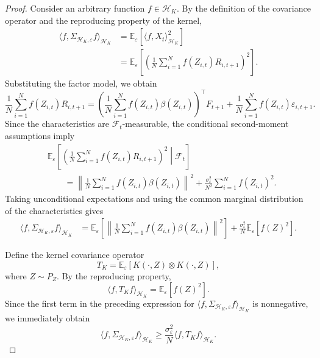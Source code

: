 \begin{proof}
Consider an arbitrary function $f\in\mathcal H_K$. By the definition of the covariance operator and the reproducing property of the kernel,
\[
\begin{aligned}
\langle f,\Sigma_{\mathcal H_K,\varepsilon}f\rangle_{\mathcal H_K}
&=\mathbb E_\varepsilon[\langle f,X_t\rangle_{\mathcal H_K}^2]\\
&=\mathbb E_\varepsilon\left[
\left(\frac1N\sum_{i=1}^N f(Z_{i,t})R_{i,t+1}\right)^2
\right].
\end{aligned}
\]
Substituting the factor model, we obtain
\[
\frac1N\sum_{i=1}^N f(Z_{i,t})R_{i,t+1}
=\left(\frac1N\sum_{i=1}^N f(Z_{i,t})\beta(Z_{i,t})\right)^\top F_{t+1}
+\frac1N\sum_{i=1}^N f(Z_{i,t})\varepsilon_{i,t+1}.
\]
Since the characteristics are $\mathcal F_t$-measurable, the conditional second-moment assumptions imply
\[
\begin{aligned}
&\mathbb E_\varepsilon\left[
\left(\frac1N\sum_{i=1}^N f(Z_{i,t})R_{i,t+1}\right)^2
\middle|\mathcal F_t\right]\\
&\qquad=
\left\|\frac1N\sum_{i=1}^N f(Z_{i,t})\beta(Z_{i,t})\right\|^2
+\frac{\sigma_\varepsilon^2}{N^2}\sum_{i=1}^N f(Z_{i,t})^2.
\end{aligned}
\]
Taking unconditional expectations and using the common marginal distribution of the characteristics gives
\[
\begin{aligned}
\langle f,\Sigma_{\mathcal H_K,\varepsilon}f\rangle_{\mathcal H_K}
&=\mathbb E_\varepsilon\left[
\left\|\frac1N\sum_{i=1}^N f(Z_{i,t})\beta(Z_{i,t})\right\|^2
\right]
+\frac{\sigma_\varepsilon^2}{N}\mathbb E_\varepsilon[f(Z)^2].
\end{aligned}
\]

Define the kernel covariance operator
\[
T_K=\mathbb E_\varepsilon[K(\cdot,Z)\otimes K(\cdot,Z)],
\]
where $Z\sim P_Z$. By the reproducing property,
\[
\langle f,T_Kf\rangle_{\mathcal H_K}
=\mathbb E_\varepsilon[f(Z)^2].
\]
Since the first term in the preceding expression for $\langle f,\Sigma_{\mathcal H_K,\varepsilon}f\rangle_{\mathcal H_K}$ is nonnegative, we immediately obtain
\[
\langle f,\Sigma_{\mathcal H_K,\varepsilon}f\rangle_{\mathcal H_K}
\geq\frac{\sigma_\varepsilon^2}{N}
\langle f,T_Kf\rangle_{\mathcal H_K}.
\]


\end{proof}
